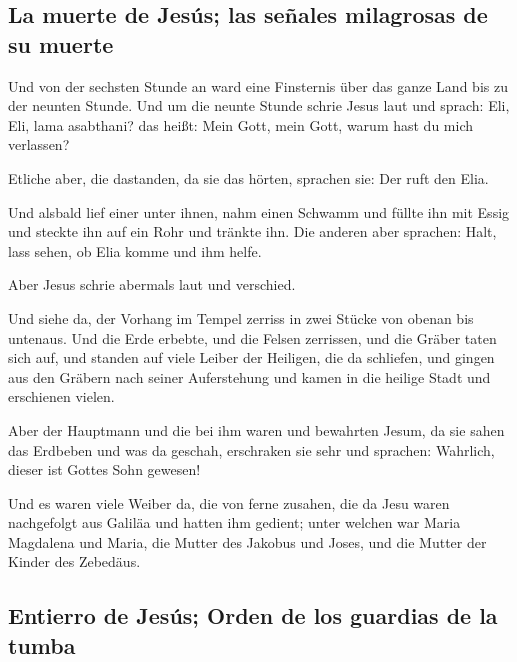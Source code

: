 \hypertarget{la-muerte-de-jesuxfas-las-seuxf1ales-milagrosas-de-su-muerte}{%
\subsection{La muerte de Jesús; las señales milagrosas de su
muerte}\label{la-muerte-de-jesuxfas-las-seuxf1ales-milagrosas-de-su-muerte}}

 Und von der sechsten Stunde an ward eine Finsternis über
das ganze Land bis zu der neunten Stunde.  Und um die
neunte Stunde schrie Jesus laut und sprach: Eli, Eli, lama asabthani?
das heißt: Mein Gott, mein Gott, warum hast du mich verlassen?

 Etliche aber, die dastanden, da sie das hörten, sprachen
sie: Der ruft den Elia.

 Und alsbald lief einer unter ihnen, nahm einen Schwamm
und füllte ihn mit Essig und steckte ihn auf ein Rohr und tränkte ihn.
 Die anderen aber sprachen: Halt, lass sehen, ob Elia
komme und ihm helfe.

 Aber Jesus schrie abermals laut und verschied.

 Und siehe da, der Vorhang im Tempel zerriss in zwei
Stücke von obenan bis untenaus.  Und die Erde erbebte,
und die Felsen zerrissen, und die Gräber taten sich auf, und standen auf
viele Leiber der Heiligen, die da schliefen,  und gingen
aus den Gräbern nach seiner Auferstehung und kamen in die heilige Stadt
und erschienen vielen.

 Aber der Hauptmann und die bei ihm waren und bewahrten
Jesum, da sie sahen das Erdbeben und was da geschah, erschraken sie sehr
und sprachen: Wahrlich, dieser ist Gottes Sohn gewesen!

 Und es waren viele Weiber da, die von ferne zusahen, die
da Jesu waren nachgefolgt aus Galiläa und hatten ihm gedient;
 unter welchen war Maria Magdalena und Maria, die Mutter
des Jakobus und Joses, und die Mutter der Kinder des Zebedäus.

\hypertarget{entierro-de-jesuxfas-orden-de-los-guardias-de-la-tumba}{%
\subsection{Entierro de Jesús; Orden de los guardias de la
tumba}\label{entierro-de-jesuxfas-orden-de-los-guardias-de-la-tumba}}

